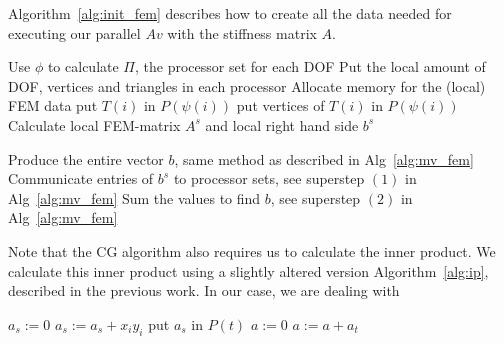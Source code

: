 \documentclass[11pt]{amsart}
\theoremstyle{definition}
\begin{document}
Algorithm~\ref{alg:init_fem} describes how to create all the data needed for executing our parallel $Av$ with the stiffness matrix $A$.
\begin{algorithm}[H]
	 {
		Use $\phi$ to calculate $\Pi$, the processor set for each DOF\; 
		Put the local amount of DOF, vertices and triangles in each processor\;
	}
	Allocate memory for the (local) FEM data\;
	 {
		 {
			put $T(i)$ in $P(\psi(i))$\;
			put vertices of $T(i)$ in $P(\psi(i))$ 
		}
	}
	Calculate local FEM-matrix $A^s$ and local right hand side $b^s$\;
	
  { Produce the entire vector $b$, same method as described in Alg~\ref{alg:mv_fem} }
	Communicate entries of $b^s$ to processor sets, see superstep $(1)$ in Alg~\ref{alg:mv_fem}\;
	Sum the values to find $b$, see superstep $(2)$ in Alg~\ref{alg:mv_fem}\;
 \caption{Algorithm that calculates the local FEM data.}
 \label{alg:init_fem}
\end{algorithm}

Note that the CG algorithm also requires us to calculate the inner product. We calculate this inner product using a slightly altered version Algorithm~\ref{alg:ip}, described in the previous work. In our case, we are dealing with
\begin{algorithm}[H]
  $a_s := 0$\;
	 {
	  $a_s := a_s + x_i y_i$\;
	}
   {
		put $a_s$ in $P(t)$\;
	}
  $a := 0$\;
   {
		$a := a + a_t$\;
	}
 \caption{Inner product for vectors in FEM-system for $P(s)$}
 \label{alg:ip_fem}
\end{algorithm}
\end{document}
